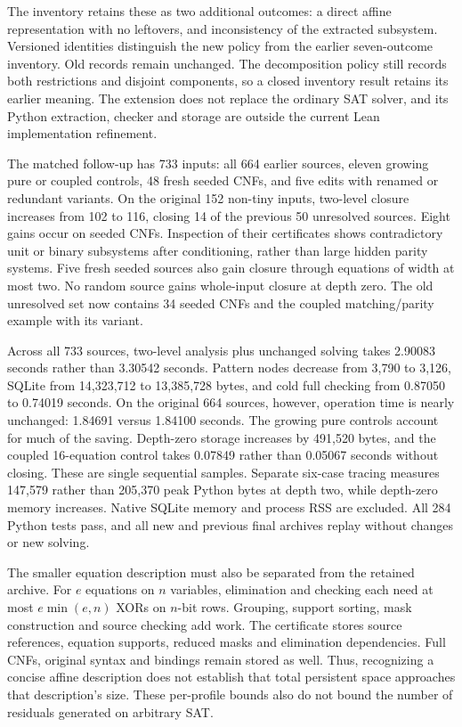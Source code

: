 \documentclass[11pt,a4paper]{article}
\numberwithin{equation}{section}
\theoremstyle{plain}
\theoremstyle{definition}
\theoremstyle{remark}
\begin{document}
The inventory retains these as two additional outcomes: a direct affine representation with no leftovers, and inconsistency of the extracted subsystem. Versioned identities distinguish the new policy from the earlier seven-outcome inventory. Old records remain unchanged. The decomposition policy still records both restrictions and disjoint components, so a closed inventory result retains its earlier meaning. The extension does not replace the ordinary SAT solver, and its Python extraction, checker and storage are outside the current Lean implementation refinement.

The matched follow-up has 733 inputs: all 664 earlier sources, eleven growing pure or coupled controls, 48 fresh seeded CNFs, and five edits with renamed or redundant variants. On the original 152 non-tiny inputs, two-level closure increases from 102 to 116, closing 14 of the previous 50 unresolved sources. Eight gains occur on seeded CNFs. Inspection of their certificates shows contradictory unit or binary subsystems after conditioning, rather than large hidden parity systems. Five fresh seeded sources also gain closure through equations of width at most two. No random source gains whole-input closure at depth zero. The old unresolved set now contains 34 seeded CNFs and the coupled matching/parity example with its variant.

Across all 733 sources, two-level analysis plus unchanged solving takes 2.90083 seconds rather than 3.30542 seconds. Pattern nodes decrease from 3,790 to 3,126, SQLite from 14,323,712 to 13,385,728 bytes, and cold full checking from 0.87050 to 0.74019 seconds. On the original 664 sources, however, operation time is nearly unchanged: 1.84691 versus 1.84100 seconds. The growing pure controls account for much of the saving. Depth-zero storage increases by 491,520 bytes, and the coupled 16-equation control takes 0.07849 rather than 0.05067 seconds without closing. These are single sequential samples. Separate six-case tracing measures 147,579 rather than 205,370 peak Python bytes at depth two, while depth-zero memory increases. Native SQLite memory and process RSS are excluded. All 284 Python tests pass, and all new and previous final archives replay without changes or new solving.

The smaller equation description must also be separated from the retained archive. For $e$ equations on $n$ variables, elimination and checking each need at most $e\min(e,n)$ XORs on $n$-bit rows. Grouping, support sorting, mask construction and source checking add work. The certificate stores source references, equation supports, reduced masks and elimination dependencies. Full CNFs, original syntax and bindings remain stored as well. Thus, recognizing a concise affine description does not establish that total persistent space approaches that description's size. These per-profile bounds also do not bound the number of residuals generated on arbitrary SAT.
\end{document}
